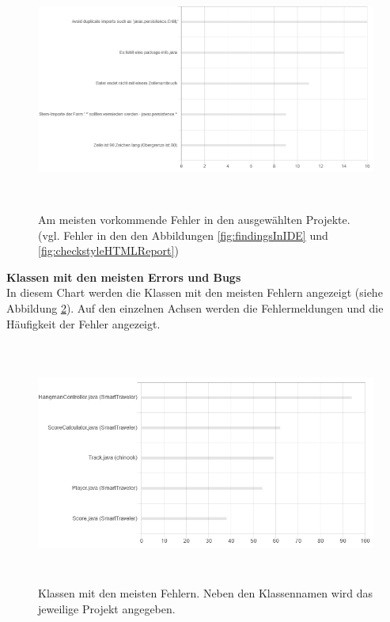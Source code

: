 \begin{figure}[tp]
  \centering
  \includegraphics[height=8cm]{images/mostCommonErrors.PNG}
 \caption[Am meisten vorkommende Fehler in den ausgewählten Projekte. (vgl. Fehler in den den Abbildungen \ref{fig:checkstyleHTMLReport} und \ref{fig:findingsInIDE})]{Am meisten vorkommende Fehler in den ausgewählten Projekte. (vgl. Fehler in den den Abbildungen \ref{fig:findingsInIDE} und \ref{fig:checkstyleHTMLReport})}
  \label{fig:mostCommonErrors}
\end{figure}

\textbf{Klassen mit den meisten Errors und Bugs} \\
In diesem Chart werden die Klassen mit den meisten Fehlern angezeigt (siehe Abbildung \ref{fig:mostCommonClasses}). Auf den einzelnen Achsen werden die Fehlermeldungen und die Häufigkeit der Fehler angezeigt.

\begin{figure}[tp]
  \centering
  \includegraphics[height=8cm]{images/mostCommonClasses.PNG}
 \caption[Klassen mit den meisten Fehlern. Neben den Klassennamen wird das jeweilige Projekt angegeben.]{Klassen mit den meisten Fehlern. Neben den Klassennamen wird das jeweilige Projekt angegeben.}
  \label{fig:mostCommonClasses}
\end{figure}

